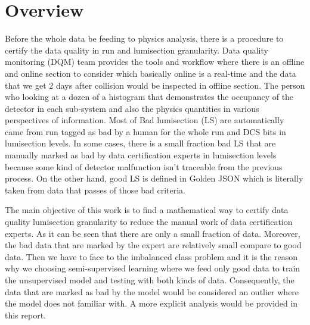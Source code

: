 \chapter{Overview}

Before the whole data be feeding to physics analysis, there is a procedure to certify the data quality in run and lumisection granularity. Data quality monitoring (DQM) team provides the tools and workflow where there is an offline and online section to consider which basically online is a real-time and the data that we get 2 days after collision would be inspected in offline section. The person who looking at a dozen of a histogram that demonstrates the occupancy of the detector in each sub-system and also the physics quantities in various perspectives of information. Most of Bad lumisection (LS) are automatically came from run tagged as bad by a human for the whole run and DCS bits in lumisection levels. In some cases, there is a small fraction bad LS that are manually marked as bad by data certification experts in lumisection levels because some kind of detector malfunction isn’t traceable from the previous process. On the other hand, good LS is defined in Golden JSON which is literally taken from data that passes of those bad criteria.

The main objective of this work is to find a mathematical way to certify data quality lumisection granularity to reduce the manual work of data certification experts. As it can be seen that there are only a small fraction of data. Moreover, the bad data that are marked by the expert are relatively small compare to good data. Then we have to face to the imbalanced class problem and it is the reason why we choosing semi-supervised learning where we feed only good data to train the unsupervised model and testing with both kinds of data. Consequently, the data that are marked as bad by the model would be considered an outlier where the model does not familiar with. A more explicit analysis would be provided in this report.